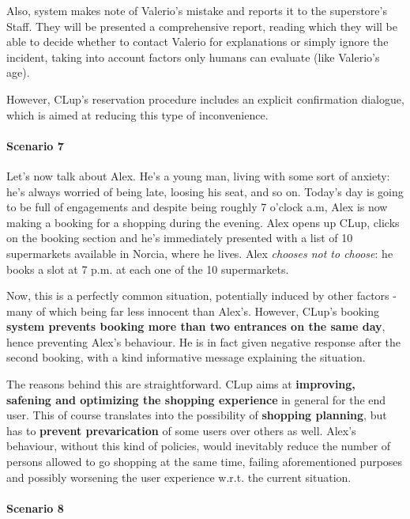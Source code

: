 Also, system makes note of Valerio's mistake and reports it to the superstore's Staff. They will be presented a comprehensive report, reading which they will be able to decide whether to contact Valerio for explanations or simply ignore the incident, taking into account factors only humans can evaluate (like Valerio's age).\newline

However, CLup's reservation procedure includes an explicit confirmation dialogue, which is aimed at reducing this type of inconvenience.

\paragraph{Scenario 7}

Let's now talk about Alex. He's a young man, living with some sort of anxiety: he's always worried of being late, loosing his seat, and so on.
Today's day is going to be full of engagements and despite being roughly 7 o'clock a.m, Alex is now making a booking for a shopping during the evening. \newline
Alex opens up CLup, clicks on the booking section and he's immediately presented with a list of 10 supermarkets available in Norcia, where he lives. Alex \textit{chooses not to choose}: he books a slot at 7 p.m. at each one of the 10 supermarkets.

Now, this is a perfectly common situation, potentially induced by other factors - many of which being far less innocent than Alex's. \newline
However, CLup's booking \textbf{system prevents booking more than two entrances on the same day}, hence preventing Alex's behaviour. He is in fact given negative response after the second booking, with a kind informative message explaining the situation.

The reasons behind this are straightforward. CLup aims at \textbf{improving, safening and optimizing the shopping experience} in general for the end user. This of course translates into the possibility of \textbf{shopping planning}, but has to \textbf{prevent prevarication} of some users over others as well. \newline
Alex's behaviour, without this kind of policies, would inevitably reduce the number of persons allowed to go shopping at the same time, failing aforementioned purposes and possibly worsening the user experience w.r.t. the current situation.

\paragraph{Scenario 8}


